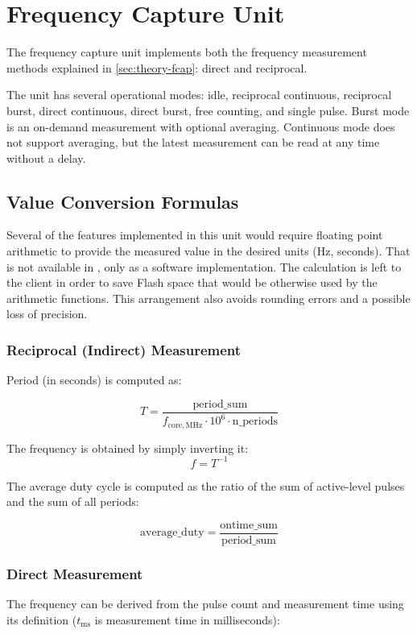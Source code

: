 
\section{Frequency Capture Unit}

The frequency capture unit implements both the frequency measurement methods explained in \cref{sec:theory-fcap}: direct and reciprocal.

The unit has several operational modes: idle, reciprocal continuous, reciprocal burst, direct continuous, direct burst, free counting, and single pulse. Burst mode is an on-demand measurement with optional averaging. Continuous mode does not support averaging, but the latest measurement can be read at any time without a delay.

\subsection{Value Conversion Formulas}

Several of the features implemented in this unit would require floating point arithmetic to provide the measured value in the desired units (Hz, seconds). That is not available in \armcm, only as a software implementation. The calculation is left to the client in order to save Flash space that would be otherwise used by the arithmetic functions. This arrangement also avoids rounding errors and a possible loss of precision.

\subsubsection{Reciprocal (Indirect) Measurement}

Period (in seconds) is computed as:

\[
	T = \dfrac{\mathrm{period\_sum}}{f_\mathrm{core,MHz} \cdot 10^6 \cdot \mathrm{n\_periods}}
\]

\noindent
The frequency is obtained by simply inverting it: \[f=T^{-1}\]

The average duty cycle is computed as the ratio of the sum of active-level pulses and the sum of all periods:

\[\mathrm{average\_duty} = \dfrac{\mathrm{ontime\_sum}}{\mathrm{period\_sum}}\]

\subsubsection{Direct Measurement}

The frequency can be derived from the pulse count and measurement time using its definition ($t_\mathrm{ms}$ is measurement time in milliseconds):

